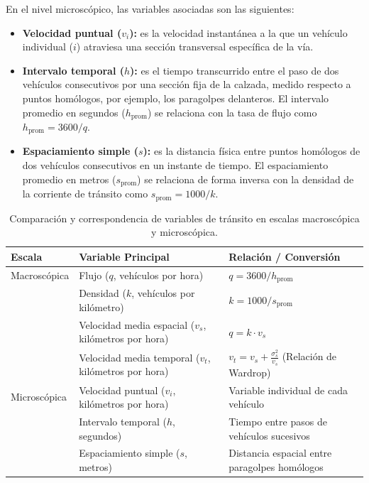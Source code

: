 En el nivel microscópico, las variables asociadas son las siguientes:
\begin{itemize}
    \item \textbf{Velocidad puntual ($v_i$):} es la velocidad instantánea a la que un vehículo individual ($i$) atraviesa una sección transversal específica de la vía.
    \item \textbf{Intervalo temporal ($h$):} es el tiempo transcurrido entre el paso de dos vehículos consecutivos por una sección fija de la calzada, medido respecto a puntos homólogos, por ejemplo, los paragolpes delanteros. El intervalo promedio en segundos ($h_{\text{prom}}$) se relaciona con la tasa de flujo como $h_{\text{prom}} = 3600/q$.
    \item \textbf{Espaciamiento simple ($s$):} es la distancia física entre puntos homólogos de dos vehículos consecutivos en un instante de tiempo. El espaciamiento promedio en metros ($s_{\text{prom}}$) se relaciona de forma inversa con la densidad de la corriente de tránsito como $s_{\text{prom}} = 1000/k$.
\end{itemize}

\begin{table}[H]
\centering
\caption[Variables de tránsito macroscópicas y microscópicas]{Comparación y correspondencia de variables de tránsito en escalas macroscópica y microscópica.}
\label{tab:variables_transito}
\setlength{\tabcolsep}{4pt}
\begin{tabular}{|>{\raggedright\arraybackslash}p{2.8cm}|>{\raggedright\arraybackslash}p{4.0cm}|>{\raggedright\arraybackslash}p{4.9cm}|}
\hline
\textbf{Escala} & \textbf{Variable Principal} & \textbf{Relación / Conversión} \\ \hline
Macroscópica & Flujo ($q$, vehículos por hora) & $q = 3600 / h_{\text{prom}}$ \\ \cline{2-3}
 & Densidad ($k$, vehículos por kilómetro) & $k = 1000 / s_{\text{prom}}$ \\ \cline{2-3}
 & Velocidad media espacial ($v_s$, kilómetros por hora) & $q = k \cdot v_s$ \\ \cline{2-3}
 & Velocidad media temporal ($v_t$, kilómetros por hora) & $v_t = v_s + \frac{\sigma_s^2}{v_s}$ (Relación de Wardrop) \\ \hline
Microscópica & Velocidad puntual ($v_i$, kilómetros por hora) & Variable individual de cada vehículo \\ \cline{2-3}
 & Intervalo temporal ($h$, segundos) & Tiempo entre pasos de vehículos sucesivos \\ \cline{2-3}
 & Espaciamiento simple ($s$, metros) & Distancia espacial entre paragolpes homólogos \\ \hline
\end{tabular}
\end{table}

